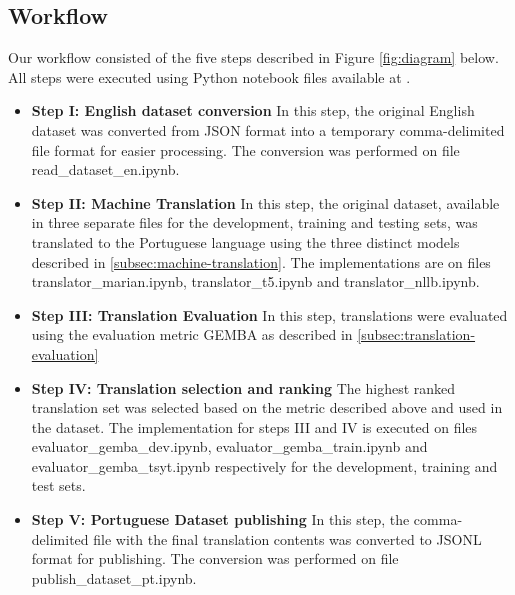 \documentclass{article}
\begin{document}
\subsection{Workflow}
Our workflow consisted of the five steps described in Figure
\ref{fig:diagram} below. All steps were executed using Python notebook files
available at \cite{socialiqa_pt_impl}.

\begin{itemize}
    \item \textbf{Step I: English dataset conversion} In this step, the original
    English dataset was converted from JSON format into a temporary 
    comma-delimited file format for easier processing. The conversion was
    performed on file read\_dataset\_en.ipynb.
    \item \textbf{Step II: Machine Translation} In this step, the original
    dataset, available in three separate files for the development, training and
    testing sets, was translated to the Portuguese language using the three
    distinct models described in \ref{subsec:machine-translation}. The
    implementations are on files translator\_marian.ipynb, translator\_t5.ipynb
    and translator\_nllb.ipynb.
    \item \textbf{Step III: Translation Evaluation} In this step, translations were evaluated
    using the evaluation metric GEMBA as described in \ref{subsec:translation-evaluation}
    \item \textbf{Step IV: Translation selection and ranking} The highest ranked translation set
    was selected based on the metric described above and used in the dataset.
    The implementation for steps III and IV is executed on files
    evaluator\_gemba\_dev.ipynb, evaluator\_gemba\_train.ipynb and
    evaluator\_gemba\_tsyt.ipynb respectively for the development, training and
    test sets.
    \item \textbf{Step V: Portuguese Dataset publishing}  In this step, the
    comma-delimited file with the final translation contents was converted to
    JSONL format for publishing. The conversion was performed on file 
    publish\_dataset\_pt.ipynb.
\end{itemize}
 
\end{document}
